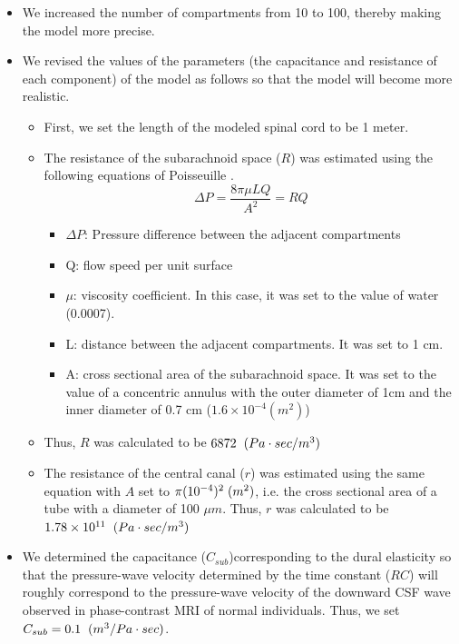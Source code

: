 \documentclass[fleqn,10pt]{wlscirep}
\begin{document}
\begin{itemize}
    \item We increased the number of compartments from 10 to 100,
        thereby making the model more precise.
    \item We revised the values of the parameters
        (the capacitance and resistance of each component)
        of the model as follows so that the model will become more realistic.
        \begin{itemize}
            \item First, we set the length of the modeled spinal cord to be 1 meter.
            \item The resistance of the subarachnoid space ($R$) was
                estimated using the following equations of Poisseuille
                \cite{brook1999numerical, sherwin2003computational, huilgol2020fast}. 
             $$\Delta P=\frac{8\pi \mu{}LQ}{A^{2}}=RQ$$
                \begin{itemize}
                    \item $\Delta P$: Pressure difference between the adjacent compartments
                    \item Q: flow speed per unit surface
                    \item $\mu$: viscosity coefficient. In this case, it was set to the value of water (0.0007).
                    \item L: distance between the adjacent compartments. It was set to 1 cm.
                    \item A: cross sectional area of the subarachnoid
                        space. It was set to the value of a concentric
                        annulus \cite{huilgol2020fast} with the outer diameter of 1cm and the inner diameter of 0.7 cm ($1.6\times{}10^{-4} (m^2)$) 
                \end{itemize}
            \item Thus, $R$ was calculated to be $6872\hspace{0.2cm}(Pa\cdot{}sec/m^3)$
            \item The resistance of the central canal ($r$) was estimated
                using the same equation with $A$ set to
                $\pi{}(10^{-4})^2\hspace{0.1cm}(m^2)$, i.e. the cross
                sectional area of a tube with a diameter of 100 $\mu{}m$.
                Thus, $r$ was calculated to be $1.78\times10^{11}\hspace{0.2cm}(Pa\cdot{}sec/m^3)$
        \end{itemize}
    \item We determined the capacitance ($C_{sub}$)corresponding to the dural elasticity so that the pressure-wave velocity determined by the time constant ($RC$) will roughly correspond to the pressure-wave velocity of the downward CSF wave observed in phase-contrast MRI of normal individuals. Thus, we set $C_{sub}=0.1\hspace{0.2cm}(m^3/Pa\cdot{}sec)$.
\end{itemize}
\end{document}
